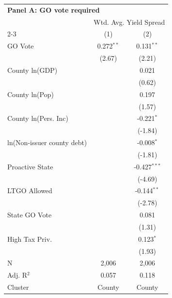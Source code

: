 \begingroup
\centering
\begin{tabular*}{\textwidth}{@{\extracolsep{\fill}}lcc}
\multicolumn{5}{l}{\textbf{Panel A: GO vote required}}\\

\addlinespace
   \toprule
    & \multicolumn{2}{c}{Wtd. Avg. Yield Spread}\\
   \cmidrule(lr){2-3}
                              & (1)          & (2)\\  
   \midrule 
   GO Vote                    & 0.272$^{**}$ & 0.131$^{**}$\\   
                              & (2.67)       & (2.21)\\   
   County ln(GDP)             &              & 0.021\\   
                              &              & (0.62)\\   
   County ln(Pop)             &              & 0.197\\   
                              &              & (1.57)\\   
   County ln(Pers. Inc)       &              & -0.221$^{*}$\\   
                              &              & (-1.84)\\   
   ln(Non-issuer county debt) &              & -0.008$^{*}$\\   
                              &              & (-1.81)\\   
   Proactive State            &              & -0.427$^{***}$\\   
                              &              & (-4.69)\\   
   LTGO Allowed               &              & -0.144$^{**}$\\   
                              &              & (-2.78)\\   
   State GO Vote              &              & 0.081\\   
                              &              & (1.31)\\   
   High Tax Priv.             &              & 0.123$^{*}$\\   
                              &              & (1.93)\\   
   \hline
   N               & 2,006        & 2,006\\  
   Adj. R$^2$             & 0.057        & 0.118\\  
   Cluster              & County & County\\  
   \bottomrule
\end{tabular*}
\par\endgroup
